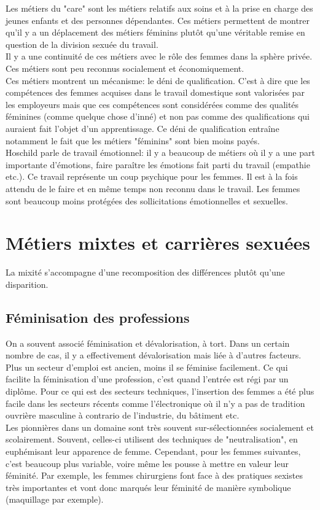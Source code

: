 \documentclass[12pt, a4paper, openany]{book}
\begin{document}
Les métiers du "care" sont les métiers relatifs aux soins et à la prise en charge des jeunes enfants et des personnes dépendantes. Ces métiers permettent de montrer qu'il y a un déplacement des métiers féminins plutôt qu'une véritable remise en question de la division sexuée du travail. \\
Il y a une continuité de ces métiers avec le rôle des femmes dans la sphère privée. Ces métiers sont peu reconnus socialement et économiquement. \\
Ces métiers montrent un mécanisme: le déni de qualification. C'est à dire que les compétences des femmes acquises dans le travail domestique sont valorisées par les employeurs mais que ces compétences sont considérées comme des qualités féminines (comme quelque chose d'inné) et non pas comme des qualifications qui auraient fait l'objet d'un apprentissage. Ce déni de qualification entraîne notamment le fait que les métiers "féminins" sont bien moins payés. \\
Hoschild parle de travail émotionnel: il y a beaucoup de métiers où il y a une part importante d'émotions, faire paraître les émotions fait parti du travail (empathie etc.). Ce travail représente un coup psychique pour les femmes. Il est à la fois attendu de le faire et en même temps non reconnu dans le travail. Les femmes sont beaucoup moins protégées des sollicitations émotionnelles et sexuelles. 


\section{Métiers mixtes et carrières sexuées}

La mixité s'accompagne d'une recomposition des différences plutôt qu'une disparition.

\subsection{Féminisation des professions}

On a souvent associé féminisation et dévalorisation, à tort. Dans un certain nombre de cas, il y a effectivement dévalorisation mais liée à d'autres facteurs. \\
Plus un secteur d'emploi est ancien, moins il se féminise facilement. Ce qui facilite la féminisation d'une profession, c'est quand l'entrée est régi par un diplôme. Pour ce qui est des secteurs techniques, l'insertion des femmes a été plus facile dans les secteurs récents comme l'électronique où il n'y a pas de tradition ouvrière masculine à contrario de l'industrie, du bâtiment etc. \\
Les pionnières dans un domaine sont très souvent sur-sélectionnées socialement et scolairement. Souvent, celles-ci utilisent des techniques de "neutralisation", en euphémisant leur apparence de femme. Cependant, pour les femmes suivantes, c'est beaucoup plus variable, voire même les pousse à mettre en valeur leur féminité. Par exemple, les femmes chirurgiens font face à des pratiques sexistes très importantes et vont donc marqués leur féminité de manière symbolique (maquillage par exemple). 
\end{document}
